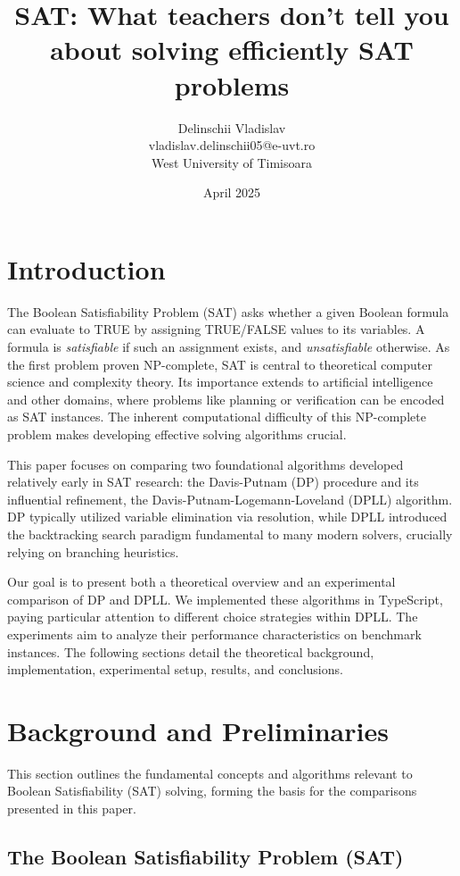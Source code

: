 \documentclass[12pt, a4paper]{article}
\title{SAT: What teachers don't tell you about solving efficiently SAT problems}
\author{Delinschii Vladislav\\ vladislav.delinschii05@e-uvt.ro \\ West University of Timisoara}
\date{April 2025}
\begin{document}
\maketitle

\section{Introduction}
\label{sec:introduction} %

The Boolean Satisfiability Problem (SAT) asks whether a given Boolean formula can evaluate to TRUE by assigning TRUE/FALSE values to its variables. A formula is \emph{satisfiable} if such an assignment exists, and \emph{unsatisfiable} otherwise. As the first problem proven NP-complete, SAT is central to theoretical computer science and complexity theory. Its importance extends to artificial intelligence and other domains, where problems like planning or verification can be encoded as SAT instances. The inherent computational difficulty of this NP-complete problem makes developing effective solving algorithms crucial.

This paper focuses on comparing two foundational algorithms developed relatively early in SAT research: the Davis-Putnam (DP) procedure and its influential refinement, the Davis-Putnam-Logemann-Loveland (DPLL) algorithm. DP typically utilized variable elimination via resolution, while DPLL introduced the backtracking search paradigm fundamental to many modern solvers, crucially relying on branching heuristics.

Our goal is to present both a theoretical overview and an experimental comparison of DP and DPLL. We implemented these algorithms in TypeScript, paying particular attention to different choice strategies within DPLL. The experiments aim to analyze their performance characteristics on benchmark instances. The following sections detail the theoretical background, implementation, experimental setup, results, and conclusions.


\section{Background and Preliminaries}
\label{sec:background}

This section outlines the fundamental concepts and algorithms relevant to Boolean Satisfiability (SAT) solving, forming the basis for the comparisons presented in this paper.

\subsection{The Boolean Satisfiability Problem (SAT)}
\label{subsec:sat_definition}
\end{document}
